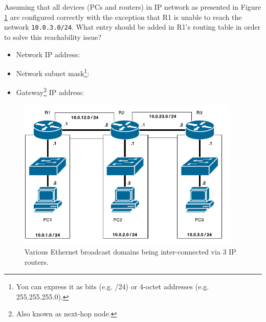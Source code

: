 \documentclass[pdftex,12pt,a4paper]{article}
\begin{document}
    \section{}
        Assuming that all devices (PCs and routers) in IP network as presented
        in Figure \ref{fig:ip} are configured correctly with the exception that R1
        is unable to reach the network \texttt{10.0.3.0/24}. What entry should
        be added in R1's routing table in order to solve this reachability
        issue?
        \begin{itemize}
            \item Network IP address:
            \item Network subnet mask\footnote{You can express it as bits (e.g.
                /24) or 4-octet addresses (e.g. 255.255.255.0).}:
            \item Gateway\footnote{Also known as next-hop node.} IP address:
        \end{itemize}

        \begin{figure}[tbh]
            \centering
            \includegraphics[width=0.95\textwidth]{figures/diag3.pdf}
            \caption{Various Ethernet broadcast domains being inter-connected
            via 3 IP routers.}
            \label{fig:ip}
        \end{figure}

        \newpage
\end{document}
